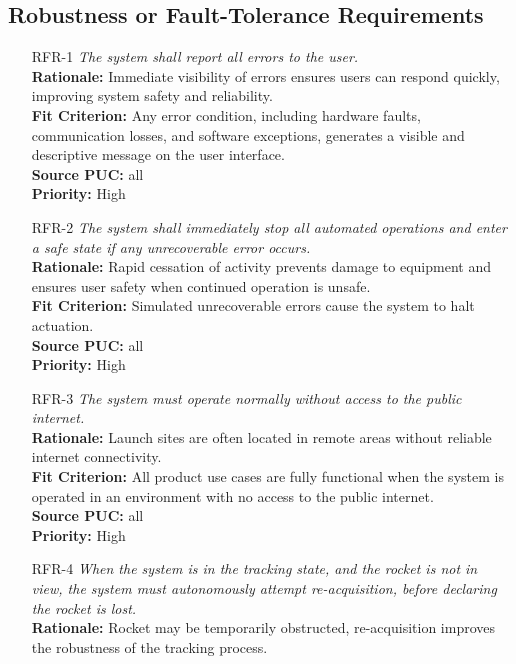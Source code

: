 \documentclass[12pt]{article}
\begin{document}
\subsection{Robustness or Fault-Tolerance Requirements}
\begin{itemize}[leftmargin=*]
  \item[RFR-1] \emph{The system shall report all errors to the user.}\\[2mm]
        \textbf{Rationale:} Immediate visibility of errors ensures users can respond quickly, improving system safety and reliability.\\
        \textbf{Fit Criterion:} Any error condition, including hardware faults, communication losses, and software exceptions, generates a visible and descriptive message on the user interface.\\
        \textbf{Source PUC:} all \\
        \textbf{Priority:} High
  \item[RFR-2] \emph{The system shall immediately stop all automated operations and
          enter a safe state if any unrecoverable error occurs.}\\[2mm]
        \textbf{Rationale:} Rapid cessation of activity prevents damage to equipment and ensures user safety when continued operation is unsafe.\\
        \textbf{Fit Criterion:} Simulated unrecoverable errors cause the system to halt actuation.\\
        \textbf{Source PUC:} all \\
        \textbf{Priority:} High
  \item[RFR-3] \emph{The system must operate normally without access to the public
          internet.}\\[2mm]
        \textbf{Rationale:} Launch sites are often located in remote areas without reliable internet connectivity.\\
        \textbf{Fit Criterion:} All product use cases are fully functional when the system is operated in an environment with no access to the public internet.\\
        \textbf{Source PUC:} all \\
        \textbf{Priority:} High
  \item[RFR-4] \emph{When the system is in the tracking state, and the rocket is not in
          view, the system must autonomously attempt re-acquisition, before declaring the
          rocket is lost.}\\[2mm]
        \textbf{Rationale:} Rocket may be temporarily obstructed, re-acquisition improves the robustness of the tracking process.\\

\end{itemize}
\end{document}
